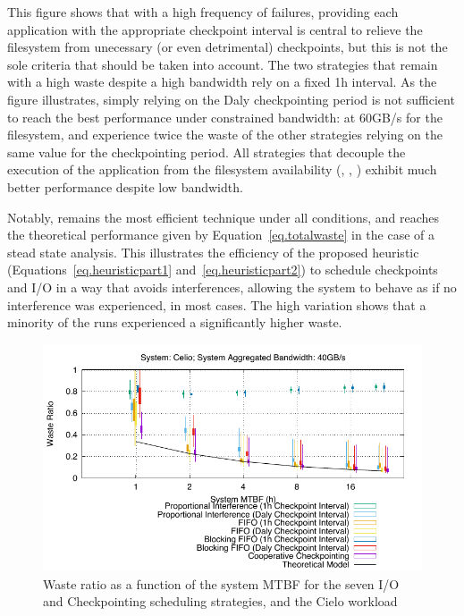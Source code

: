 This figure shows that with a high frequency of failures, providing
each application with the appropriate checkpoint interval is central
to relieve the filesystem from unecessary (or even detrimental)
checkpoints, but this is not the sole criteria that should be taken
into account. The two strategies that remain with a high waste despite
a high bandwidth rely on a fixed 1h interval. As the figure
illustrates, simply relying on the Daly checkpointing period is not
sufficient to reach the best performance under constrained bandwidth:
at 60GB/s for the filesystem, \propdaly and \bfifodaly experience
twice the waste of the other strategies relying on the same value for
the checkpointing period. All strategies that decouple the execution
of the application from the filesystem availability (\fifodaly,
\fifofixed, \cooperative) exhibit much better performance despite low
bandwidth.

Notably, \cooperative remains the most efficient technique under all
conditions, and reaches the theoretical performance given by
Equation~\eqref{eq.totalwaste} in the case of a stead state
analysis. This illustrates the efficiency of the proposed heuristic
(Equations~\eqref{eq.heuristicpart1} and~\eqref{eq.heuristicpart2}) to
schedule checkpoints and I/O in a way that avoids interferences,
allowing the system to behave as if no interference was experienced,
in most cases. The high variation shows that a minority of the runs
experienced a significantly higher waste.

\begin{figure}
  \begin{center}
    \includegraphics[width=\linewidth]{sim/figures/synthetic-040gbs-waste-celio.pdf}
  \end{center}
  \caption{Waste ratio as a function of the system MTBF for the
    seven I/O and Checkpointing scheduling strategies, and the Cielo
    workload \label{fig:cielo-40gbs}}
\end{figure}

